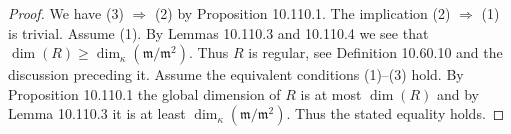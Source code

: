 \begin{proof}
We have (3) $\Rightarrow$ (2) by Proposition 10.110.1. The implication (2) $\Rightarrow$ (1) is trivial. Assume (1). By Lemmas 10.110.3 and 10.110.4 we see that $\dim(R)\geq\dim_\kappa(\mathfrak m/\mathfrak m^2)$. Thus $R$ is regular, see Definition 10.60.10 and the discussion preceding it. Assume the equivalent conditions (1)--(3) hold. By Proposition 10.110.1 the global dimension of $R$ is at most $\dim(R)$ and by Lemma 10.110.3 it is at least $\dim_\kappa(\mathfrak m/\mathfrak m^2)$. Thus the stated equality holds.
\end{proof}

